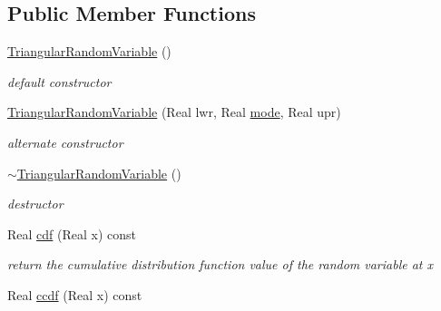 \subsection*{Public Member Functions}
\begin{DoxyCompactItemize}
\item 
\hyperlink{classPecos_1_1TriangularRandomVariable_aab4e0196b4151ac40a60bbcab39cfc6e}{Triangular\+Random\+Variable} ()\label{classPecos_1_1TriangularRandomVariable_aab4e0196b4151ac40a60bbcab39cfc6e}

\begin{DoxyCompactList}\small\item\em default constructor \end{DoxyCompactList}\item 
\hyperlink{classPecos_1_1TriangularRandomVariable_afa7e33e0d7f627fc935ea901317cd746}{Triangular\+Random\+Variable} (Real lwr, Real \hyperlink{classPecos_1_1TriangularRandomVariable_a72d3d6926edd929cb3f8e12baa655f70}{mode}, Real upr)\label{classPecos_1_1TriangularRandomVariable_afa7e33e0d7f627fc935ea901317cd746}

\begin{DoxyCompactList}\small\item\em alternate constructor \end{DoxyCompactList}\item 
\hyperlink{classPecos_1_1TriangularRandomVariable_a0bd203520d9d16bb54e74e179ac9547f}{$\sim$\+Triangular\+Random\+Variable} ()\label{classPecos_1_1TriangularRandomVariable_a0bd203520d9d16bb54e74e179ac9547f}

\begin{DoxyCompactList}\small\item\em destructor \end{DoxyCompactList}\item 
Real \hyperlink{classPecos_1_1TriangularRandomVariable_addd564e7f4f314e12d38df74d845f0d8}{cdf} (Real x) const \label{classPecos_1_1TriangularRandomVariable_addd564e7f4f314e12d38df74d845f0d8}

\begin{DoxyCompactList}\small\item\em return the cumulative distribution function value of the random variable at x \end{DoxyCompactList}\item 
Real \hyperlink{classPecos_1_1TriangularRandomVariable_a23c3b599e7e4788a9a5e9e93c3dbaf4d}{ccdf} (Real x) const \label{classPecos_1_1TriangularRandomVariable_a23c3b599e7e4788a9a5e9e93c3dbaf4d}


\end{DoxyCompactItemize}

